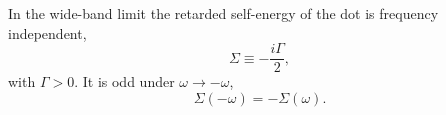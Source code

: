 \documentclass{article}
\begin{document}
In the wide-band limit the retarded self-energy of the dot is frequency independent,
\begin{equation}
\Sigma \equiv -\frac{i\Gamma}{2} ,
\label{eq:wb}
\end{equation}
with $\Gamma>0$. It is odd under $\omega\to-\omega$,
\begin{equation}
\Sigma(-\omega) = -\Sigma(\omega) .
\label{eq:odd}
\end{equation}
\end{document}
